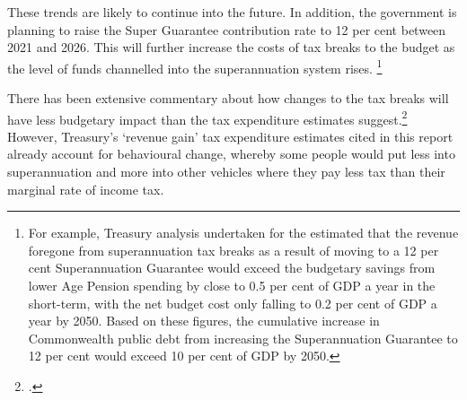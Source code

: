 These trends are likely to continue into the future. In addition, the government is planning to raise the Super Guarantee contribution rate to 12 per cent between 2021 and 2026. This will further increase the costs of tax breaks to the budget as the level of funds channelled into the superannuation system rises.%
\footnote{For example, Treasury analysis undertaken for the \textcite[][13]{CooperReview2013} estimated that the revenue foregone from superannuation tax breaks as a result of moving to a 12 per cent Superannuation Guarantee would exceed the budgetary savings from lower Age Pension spending by close to 0.5 per cent of GDP a year in the short-term, with the net budget cost only falling to 0.2 per cent of GDP a year by 2050. Based on these figures, the cumulative increase in Commonwealth public debt from increasing the Superannuation Guarantee to 12 per cent would exceed 10 per cent of GDP by 2050.} 

There has been extensive commentary about how changes to the tax breaks will have less budgetary impact than the tax expenditure estimates suggest.\footcites{Clare2015}{ASFA2015TreasurySubmission}{Mercer2013a}{Carling2015} However, Treasury’s ‘revenue gain’ tax expenditure estimates cited in this report already account for behavioural change, whereby some people would put less into superannuation and more into other vehicles where they pay less tax than their marginal rate of income tax. 

